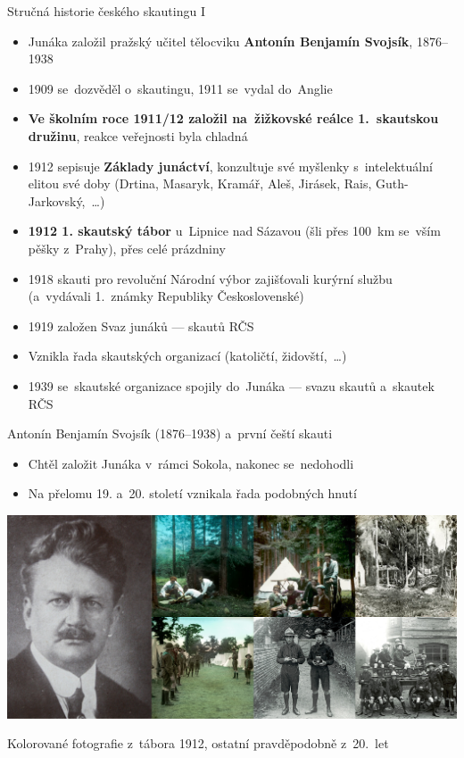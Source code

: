 \documentclass[compress, ucs, xelatex, 11pt, xcolor=dvipsnames, print,
	hyperref={
		bookmarks=true,
		unicode=true,
		colorlinks=true,
		pdftitle={Skautska vychovna metoda},
		plainpages=false,
		pdfauthor={Vojtech Zeisek},
		pdfsubject={Skautska vychovna metoda a jeji vyvoj za posledni stoleti a desetileti},
		pdfcreator={XeLaTeX},
		pdfkeywords={Junak, Pedagogika, Skaut, Skauting, Vychovna metoda},
		linkcolor=Black,
		anchorcolor=Black,
		citecolor=OliveGreen,
		filecolor=OliveGreen,
		menucolor=Black,
		urlcolor=OliveGreen,
		pdftex},
	url={hyphens, lowtilde} %
	]{beamer}
\begin{document}
\begin{frame}{Stručná historie českého skautingu I}
	\begin{itemize}
		\item Junáka založil pražský učitel tělocviku \textbf{Antonín Benjamín Svojsík}, 1876--1938
		\item 1909 se~dozvěděl o~skautingu, 1911 se~vydal do~Anglie
		\item \textbf{Ve školním roce 1911/12 založil na~žižkovské reálce 1.~skautskou družinu}, reakce veřejnosti byla chladná
		\item 1912 sepisuje \textbf{Základy junáctví}, konzultuje své myšlenky s~intelektuální elitou své doby (Drtina, Masaryk, Kramář, Aleš, Jirásek, Rais, Guth-Jarkovský,~\ldots)
		\item \textbf{1912 1. skautský tábor} u~Lipnice nad Sázavou (šli přes 100~km se~vším pěšky z~Prahy), přes celé prázdniny
		\item 1918 skauti pro revoluční Národní výbor zajišťovali kurýrní službu (a~vydávali 1.~známky Republiky Československé)
		\item 1919 založen Svaz junáků --- skautů RČS
		\item Vznikla řada skautských organizací (katoličtí, židovští,~\ldots)
		\item 1939 se~skautské organizace spojily do~Junáka --- svazu skautů a~skautek RČS
	\end{itemize}
\end{frame}

\begin{frame}{Antonín Benjamín Svojsík (1876--1938) a~první čeští skauti}
	\begin{itemize}
		\item Chtěl založit Junáka v~rámci Sokola, nakonec se~nedohodli
		\item Na přelomu 19. a~20. století vznikala řada podobných hnutí
	\end{itemize}
	\includegraphics[width=\textwidth]{svojsik_prvni_skauti.jpg}
	\begin{flushright}
		Kolorované fotografie z~tábora 1912, ostatní pravděpodobně z~20.~let
	\end{flushright}
\end{frame}
\end{document}
